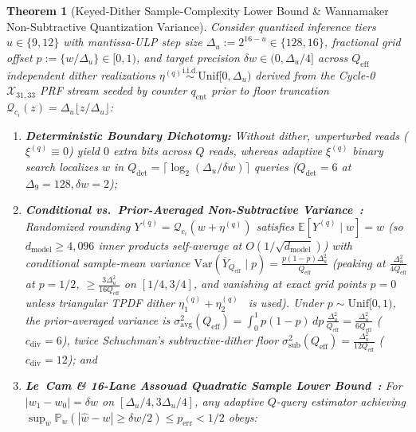 \documentclass[11pt,letterpaper]{article}
\theoremstyle{spectralthm}
\newtheorem{theorem}{Theorem}[section]
\begin{document}
\begin{theorem}[Keyed-Dither Sample-Complexity Lower Bound \& Wannamaker Non-Subtractive Quantization Variance]
\label{thm:dither_lower_bound}
Consider quantized inference tiers $u \in \{9, 12\}$ with mantissa-ULP step size $\Delta_u := 2^{16 - u} \in \{128, 16\}$, fractional grid offset $p := \{w/\Delta_u\} \in [0,1)$, and target precision $\delta w \in (0, \Delta_u/4]$ across $Q_{\mathrm{eff}}$ independent dither realizations $\eta^{(q)} \stackrel{\mathrm{i.i.d.}}{\sim} \mathrm{Unif}[0, \Delta_u)$ derived from the Cycle-0 $\mathcal{X}_{31,33}$ PRF stream seeded by counter $q_{\mathrm{cnt}}$ prior to floor truncation $\mathcal{Q}_{c_i}(z) = \Delta_u \lfloor z/\Delta_u \rfloor$:
\begin{enumerate}
  \item[(i)] \textbf{Deterministic Boundary Dichotomy:} Without dither, unperturbed reads ($\xi^{(q)} \equiv 0$) yield $0$ extra bits across $Q$ reads, whereas adaptive $\xi^{(q)}$ binary search localizes $w$ in $Q_{\mathrm{det}} = \lceil \log_2(\Delta_u / \delta w) \rceil$ queries ($Q_{\mathrm{det}} = 6$ at $\Delta_9=128, \delta w=2$);
  \item[(ii)] \textbf{Conditional vs.\ Prior-Averaged Non-Subtractive Variance~\cite{wannamaker2000nonsubtractive, schuchman1964dither, gray1993dithered}:} Randomized rounding $Y^{(q)} = \mathcal{Q}_{c_i}(w + \eta^{(q)})$ satisfies $\mathbb{E}[Y^{(q)} \mid w] = w$ (so $d_{\mathrm{model}} \ge 4,096$ inner products self-average at $O(1/\sqrt{d_{\mathrm{model}}})$) with conditional sample-mean variance $\mathrm{Var}(\overline{Y}_{Q_{\mathrm{eff}}} \mid p) = \frac{p(1-p)\Delta_u^2}{Q_{\mathrm{eff}}}$ (peaking at $\frac{\Delta_u^2}{4Q_{\mathrm{eff}}}$ at $p=1/2$, $\ge \frac{3\Delta_u^2}{16Q_{\mathrm{eff}}}$ on $[1/4,3/4]$, and vanishing at exact grid points $p=0$ unless triangular TPDF dither $\eta_1^{(q)}+\eta_2^{(q)}$~\cite{wannamaker2000nonsubtractive} is used). Under $p \sim \mathrm{Unif}[0,1)$, the prior-averaged variance is $\sigma_{\mathrm{avg}}^2(Q_{\mathrm{eff}}) = \int_0^1 p(1-p)\,dp\,\frac{\Delta_u^2}{Q_{\mathrm{eff}}} = \frac{\Delta_u^2}{6 Q_{\mathrm{eff}}}$ ($c_{\mathrm{div}} = 6$), twice Schuchman's subtractive-dither floor $\sigma_{\mathrm{sub}}^2(Q_{\mathrm{eff}}) = \frac{\Delta_u^2}{12 Q_{\mathrm{eff}}}$ ($c_{\mathrm{div}} = 12$); and
  \item[(iii)] \textbf{Le~Cam \& 16-Lane Assouad Quadratic Sample Lower Bound~\cite{assouad1983deux}:} For $|w_1 - w_0| = \delta w$ on $[\Delta_u/4, 3\Delta_u/4]$, any adaptive $Q$-query estimator achieving $\sup_w \mathbb{P}_w(|\hat{w} - w| \ge \delta w/2) \le p_{\mathrm{err}} < 1/2$ obeys:

\end{enumerate}
\end{theorem}
\end{document}
